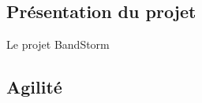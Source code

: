 \DylanSpeak
\subsection{Présentation du projet}
\begin{frame}{Le projet BandStorm}
\end{frame}

\JulianSpeak
\subsection{Agilité}
\begin{frame}
\end{frame}

